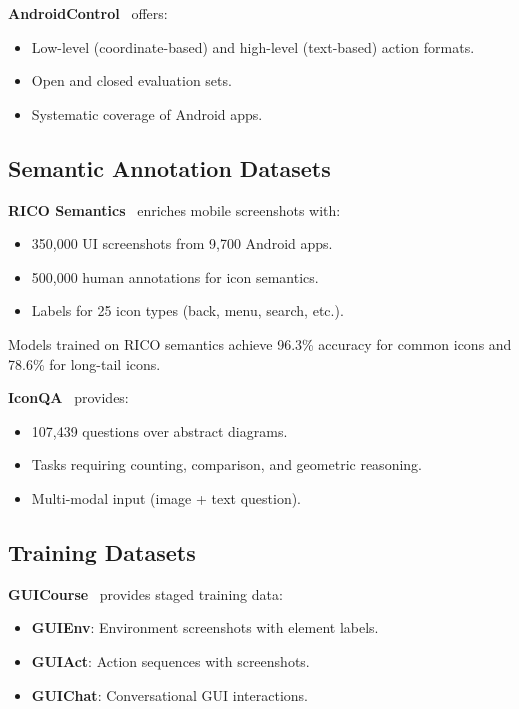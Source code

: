 \documentclass[11pt]{article}
\begin{document}
\textbf{AndroidControl}~\cite{androidcontrol2024} offers:

\begin{itemize}
    \item Low-level (coordinate-based) and high-level (text-based) action formats.
    \item Open and closed evaluation sets.
    \item Systematic coverage of Android apps.
\end{itemize}

\subsection{Semantic Annotation Datasets}

\textbf{RICO Semantics}~\cite{ricosemantics2019} enriches mobile screenshots with:

\begin{itemize}
    \item 350,000 UI screenshots from 9,700 Android apps.
    \item 500,000 human annotations for icon semantics.
    \item Labels for 25 icon types (back, menu, search, etc.).
\end{itemize}

Models trained on RICO semantics achieve 96.3\% accuracy for common icons and 78.6\% for long-tail icons.

\textbf{IconQA}~\cite{iconqa2021} provides:

\begin{itemize}
    \item 107,439 questions over abstract diagrams.
    \item Tasks requiring counting, comparison, and geometric reasoning.
    \item Multi-modal input (image + text question).
\end{itemize}

\subsection{Training Datasets}

\textbf{GUICourse}~\cite{guicourse2024} provides staged training data:

\begin{itemize}
    \item \textbf{GUIEnv}: Environment screenshots with element labels.
    \item \textbf{GUIAct}: Action sequences with screenshots.
    \item \textbf{GUIChat}: Conversational GUI interactions.
\end{itemize}
\end{document}
